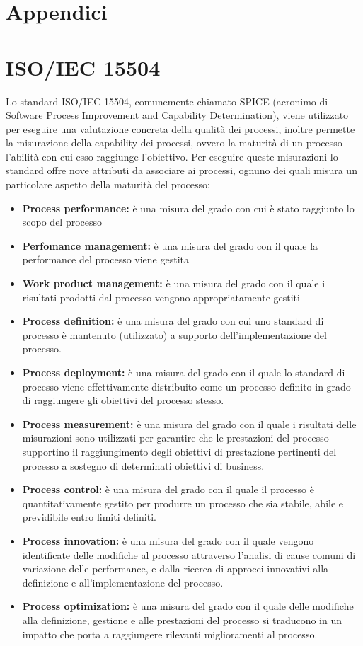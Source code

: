 \section{Appendici}
\appendix
\section{ISO/IEC 15504}
Lo standard ISO/IEC 15504, comunemente chiamato SPICE (acronimo di Software Process Improvement and Capability Determination), viene utilizzato per eseguire una valutazione concreta della qualità dei processi, inoltre permette la misurazione della capability dei processi, ovvero la maturità di un processo l'abilità con cui esso raggiunge l'obiettivo. Per eseguire queste misurazioni lo standard offre nove attributi da associare ai processi, ognuno dei quali misura un particolare aspetto della maturità del processo:
	\begin{itemize}
	\item \textbf{Process performance:} è una misura del grado con cui è stato raggiunto lo scopo del processo
	\item \textbf{Perfomance management:} è una misura del grado con il quale la performance del processo viene gestita
	\item \textbf{Work product management:} è una misura del grado con il quale i risultati prodotti dal processo vengono appropriatamente gestiti
	\item \textbf{Process definition:} è una misura del grado con cui uno standard di processo è mantenuto (utilizzato) a supporto dell'implementazione del processo.
	\item \textbf{Process deployment:} è una misura del grado con il quale lo standard di processo viene effettivamente distribuito come un processo definito in grado di raggiungere gli obiettivi del processo stesso.
	\item \textbf{Process measurement:} è una misura del grado con il quale i risultati delle misurazioni sono utilizzati per garantire che le prestazioni del processo supportino il raggiungimento degli obiettivi di prestazione pertinenti del processo a sostegno di determinati obiettivi di business.
	\item \textbf{Process control:} è una misura del grado con il quale il processo è quantitativamente gestito per produrre un processo che sia stabile, abile e previdibile entro limiti definiti.
	\item \textbf{Process innovation:} è una misura del grado con il quale vengono identificate delle modifiche al processo attraverso l'analisi di cause comuni di variazione delle performance, e dalla ricerca di approcci innovativi alla definizione e all'implementazione del processo.
	\item \textbf{Process optimization:} è una misura del grado con il quale delle modifiche alla definizione, gestione e alle prestazioni del processo si traducono in un impatto che porta a raggiungere rilevanti miglioramenti al processo.
	\end{itemize}
